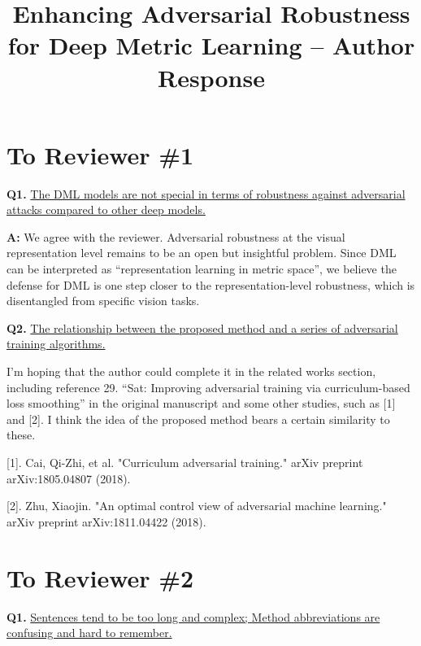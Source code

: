 \documentclass[10pt,twocolumn,letterpaper]{article}
\begin{document}
\title{Enhancing Adversarial Robustness for Deep Metric Learning -- Author Response}  %

\maketitle
\thispagestyle{empty}
\appendix

\section*{To Reviewer \#1}

\noindent\textbf{Q1.}
%
\ul{
The DML models are not special in terms of robustness against
adversarial attacks compared to other deep models.
}

\textbf{A:} 
%
We agree with the reviewer. Adversarial robustness at the visual representation
level remains to be an open but insightful problem. Since DML can be
interpreted as ``representation learning in metric space'', we believe the
defense for DML is one step closer to the representation-level robustness,
which is disentangled from specific vision tasks.

\noindent\textbf{Q2.}
%
\ul{
The relationship between the proposed method and a series of
adversarial training algorithms.
}

\cite{smoothat}

I’m hoping that the author could complete it in the related works section,
including reference 29. “Sat: Improving adversarial training via
curriculum-based loss smoothing” in the original manuscript and some other
studies, such as [1] and [2]. I think the idea of the proposed method bears a
certain similarity to these.

[1]. Cai, Qi-Zhi, et al. "Curriculum adversarial training." arXiv preprint arXiv:1805.04807 (2018).
\cite{currat}

[2]. Zhu, Xiaojin. "An optimal control view of adversarial machine learning." arXiv preprint arXiv:1811.04422 (2018).

\section*{To Reviewer \#2}

\noindent\textbf{Q1.}
%
\ul{
Sentences tend to be too long and complex; Method abbreviations are confusing
and hard to remember.
}
\end{document}
